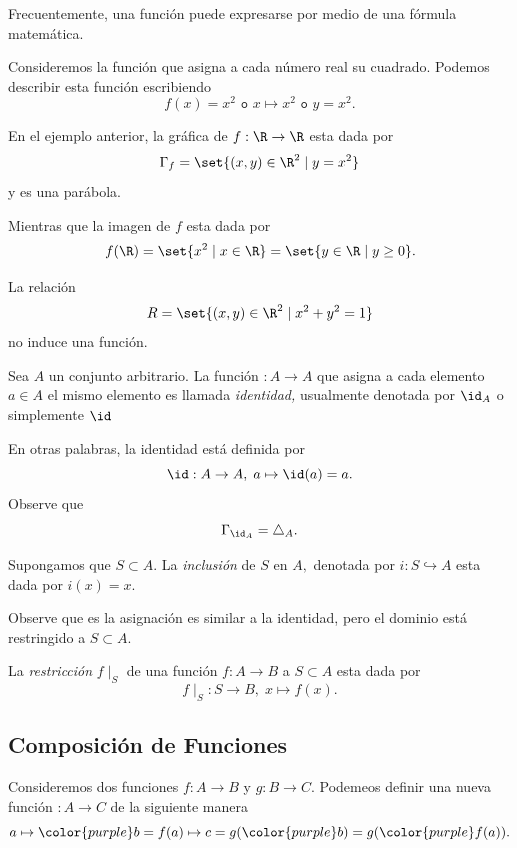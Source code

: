 Frecuentemente, una función puede expresarse por medio de una fórmula matemática. 
\begin{ejemplo}
	Consideremos la función que asigna a cada número real su cuadrado. Podemos describir esta función escribiendo
	$$
	f(x)=x^{2} \texttt{ o } x\mapsto x^{2} \texttt{ o } y=x^{2}.
	$$
\end{ejemplo}



En el ejemplo anterior, la gráfica de $f:\R \to \R$ esta dada por 
$$
\Gamma_{f}=\set{(x,y)\in \R^{2}\mid y=x^{2}}
$$ y es una parábola.


Mientras que la imagen de $f$ esta dada por 
$$
f(\R)=\set{x^{2}\mid x\in \R}=\set{y\in \R \mid y\geq 0}.
$$



\begin{ejemplo}
	La relación 
	$$
	R=\set{(x,y)\in \R^{2}\mid x^{2}+y^{2}=1}
	$$
	no induce una función.
\end{ejemplo}




\begin{ejemplo}
	Sea $A$ un conjunto arbitrario. La función $:A \to A$ que asigna a cada elemento $a\in A$ el mismo elemento es llamada \emph{identidad,} usualmente denotada por $\id_{A}$ o simplemente $\id$
	
	
	En otras palabras, la identidad está definida por $$
	\id:A\to A, \; a \mapsto \id(a)=a.
	$$ Observe que
	$$
	\Gamma_{\id_{A}}=\triangle_{A}.
	$$
\end{ejemplo}



 
 \begin{ejemplo}
  Supongamos que $S \subset A.$ La \emph{inclusión} de $S$ en $A,$ denotada por $i: S \hookrightarrow A$ esta dada por $i(x)=x.$
 
 
 Observe que es la asignación es similar a la identidad, pero el dominio está restringido a $S \subset A.$
 
 
 La \emph{restricción} $f\mid_{S}$ de una función $f:A \to B$ a $S \subset A$ esta dada por
 $$
 f\mid_{S}: S \to B, \; x\mapsto f(x).
 $$
 \end{ejemplo}
 
 

\subsection{Composición de Funciones}


Consideremos dos funciones $f:A \to B$ y $g:B \to C.$ Podemeos definir una nueva función $:A \to C$ de la siguiente manera
$$
a \mapsto {\color{purple}b=f(a)} \mapsto c=g({\color{purple}b})=g({\color{purple}f(a)}).
$$



